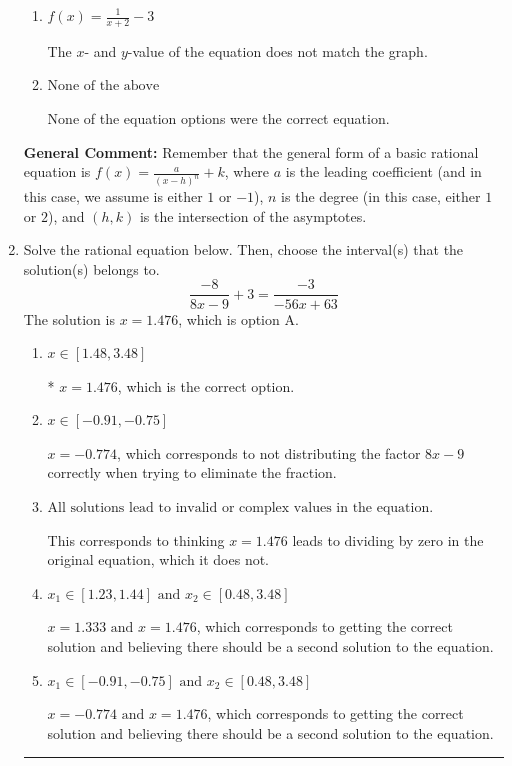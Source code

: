 \documentclass{extbook}[14pt]
\newcommand{\litem}[1]{\item #1

\rule{\textwidth}{0.4pt}}
\begin{document}
\begin{enumerate}
{\begin{enumerate}[label=\Alph*.]
Corresponds to thinking the graph was a shifted version of $\frac{1}{x^2}$, using the general form $f(x) = \frac{a}{x-h}+k$, the opposite leading coefficient, AND not noticing the $y$-value was wrong.
\item \( f(x) = \frac{1}{x + 2} - 3 \)

The $x$- and $y$-value of the equation does not match the graph.
\item \( \text{None of the above} \)

None of the equation options were the correct equation.
\end{enumerate}

\textbf{General Comment:} Remember that the general form of a basic rational equation is $ f(x) = \frac{a}{(x-h)^n} + k$, where $a$ is the leading coefficient (and in this case, we assume is either $1$ or $-1$), $n$ is the degree (in this case, either $1$ or $2$), and $(h, k)$ is the intersection of the asymptotes.
}
\litem{
Solve the rational equation below. Then, choose the interval(s) that the solution(s) belongs to.
\[ \frac{-8}{8x -9} + 3 = \frac{-3}{-56x + 63} \]The solution is \( x = 1.476 \), which is option A.\begin{enumerate}[label=\Alph*.]
\item \( x \in [1.48,3.48] \)

* $x = 1.476$, which is the correct option.
\item \( x \in [-0.91,-0.75] \)

$x = -0.774$, which corresponds to not distributing the factor $8x -9$ correctly when trying to eliminate the fraction.
\item \( \text{All solutions lead to invalid or complex values in the equation.} \)

This corresponds to thinking $x = 1.476$ leads to dividing by zero in the original equation, which it does not.
\item \( x_1 \in [1.23, 1.44] \text{ and } x_2 \in [0.48,3.48] \)

$x = 1.333 \text{ and } x = 1.476$, which corresponds to getting the correct solution and believing there should be a second solution to the equation.
\item \( x_1 \in [-0.91, -0.75] \text{ and } x_2 \in [0.48,3.48] \)

$x = -0.774 \text{ and } x = 1.476$, which corresponds to getting the correct solution and believing there should be a second solution to the equation.
\end{enumerate}

}
\end{enumerate}
\end{document}

